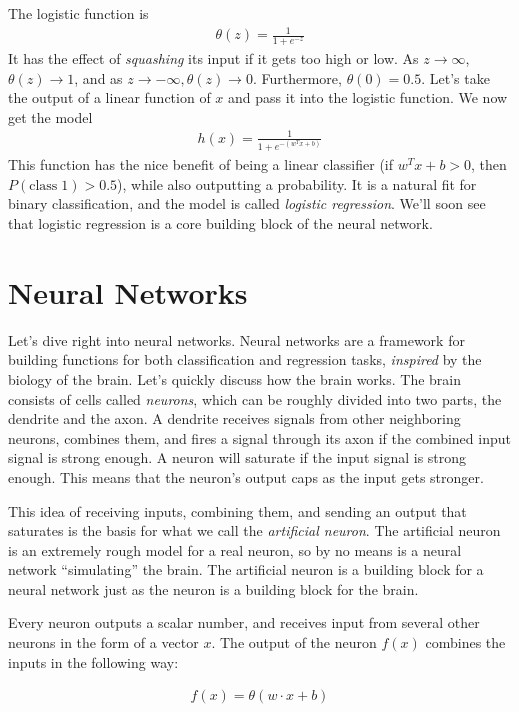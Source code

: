 \documentclass[a4paper,10pt]{article}
\begin{document}
The logistic function is
\begin{align}
  \theta(z) = \frac{1}{1 + e^{-z}}
\end{align}
It has the effect of \emph{squashing} its
input if it gets too high or low.
As $z \rightarrow \infty$, $\theta(z) \rightarrow 1$,
and as $z \rightarrow -\infty, \theta(z) \rightarrow 0$.
Furthermore, $\theta(0) = 0.5$.
Let's take the output of a linear function of $x$
and pass it into the logistic function.
We now get the model
\begin{align}
  h(x) = \frac{1}{1 + e^{-(w^Tx + b)}}
\end{align}
This function has the nice benefit of being a 
linear classifier (if $w^Tx + b > 0$, then
$P(\text{class} \; 1) > 0.5$),
while also outputting a probability.
It is a natural fit for binary classification,
and the model is called \emph{logistic regression}.
We'll soon see that logistic regression is a
core building block of the neural network.

\section{Neural Networks}
Let's dive right into neural networks.
Neural networks are a framework
for building functions
for both classification and regression tasks,
\emph{inspired} by the biology of the brain.
Let's quickly discuss how the brain works.
The brain consists of cells called
\emph{neurons}, which can be roughly divided
into two parts, the dendrite and the axon.
A dendrite receives signals from other neighboring neurons,
combines them, and 
fires a signal through its axon if the combined
input signal is strong enough.
A neuron will saturate if
the input signal is strong enough.
This means that the neuron's output
caps as the input gets stronger.

This idea of receiving inputs,
combining them, and sending an output
that saturates
is the basis for what we call
the \emph{artificial neuron}.
The artificial neuron is an extremely
rough model for a real neuron,
so by no means is a neural
network ``simulating'' the brain.
The artificial neuron is a building block
for a neural network just as the neuron
is a building block for the brain.

Every neuron outputs a scalar number,
and receives input from several other neurons
in the form of a vector $x$.
The output of the neuron $f(x)$ combines
the inputs in the following way:

\begin{align*}
  f(x) = \theta(w \cdot x + b)
\end{align*}
\end{document}
